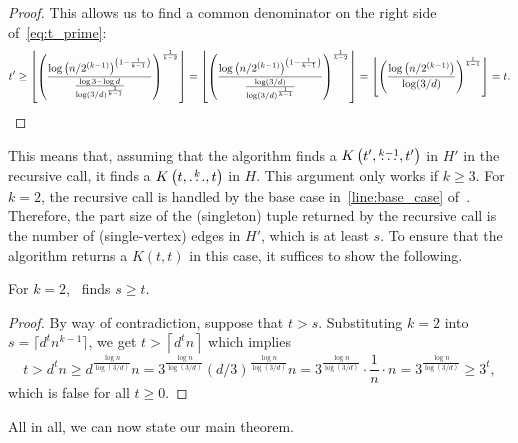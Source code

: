 \begin{lemma}
\begin{proof}
        This allows us to find a common denominator on the
        right side of~\eqref{eq:t_prime}:
        \[
            t' \geq
            \left\lfloor \left(  \frac{\log \left(n / 2^{(k-1)}\right)^{\left(1-\frac{1}{k-1}\right)}}
            {\frac{\log 3 - \log d}{\log(3 / d)^{\frac{1}{k-1}}} } \right)^
            {\frac{1}{k-2}} \right\rfloor =
            \left\lfloor \left(  \frac{\log \left(n / 2^{(k-1)}\right)^{\left( 1-\frac{1}{k-1}\right)}}
            {\frac{\log (3 / d)}{\log(3 / d)^{\frac{1}{k-1}}} } \right)^
            {\frac{1}{k-2}} \right\rfloor =
            \left\lfloor \left(  \frac{\log \left(n / 2^{(k-1)}\right)}
            {\log (3 / d)} \right)^
            {\frac{1}{k-1}} \right\rfloor =
            t. \qedhere
        \]
    \end{proof}
\end{lemma}

This means that, assuming that the algorithm finds a $K\left(t', \overset{k-1}{\dots}, t'\right)$ in $H'$ in the recursive call,
it finds a $K\left(t, \overset{k}{\dots}, t\right)$ in $H$.
This argument only works if $k \geq 3$.
For $k=2$, the recursive call is handled by the base case in~\cref{line:base_case} of~.
Therefore, the part size of the (singleton) tuple returned by the recursive call
is the number of (single-vertex) edges in $H'$, which is at least $s$.
To ensure that the algorithm returns a $K(t, t)$ in this case,
it suffices to show the following.

\newpage
\begin{lemma}\label{lm:base_case}
    For $k=2$,~ finds $s \geq t$.
    \begin{proof}
        By way of contradiction, suppose that $t > s$.
        Substituting $k=2$ into $s = \lceil d^t n^{k-1} \rceil$, we get
        $t > \left\lceil d^t n \right\rceil$ which implies
        \[
            t >
            d^t n \geq
            d^{\frac{\log n}{\log (3/d)}} n =
            3^{\frac{\log n}{\log (3/d)}}(d/3)^{\frac{\log n}{\log (3/d)}} n =
            3^{\frac{\log n}{\log (3/d)}} \cdot \frac{1}{n} \cdot n =
            3^{\frac{\log n}{\log (3/d)}} \geq
            3^t,
        \]
        which is false for all $t \geq 0$.
    \end{proof}
\end{lemma}

All in all, we can now state our main theorem.

